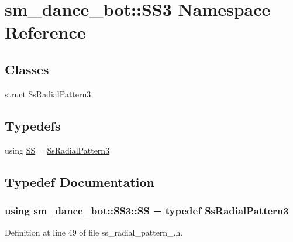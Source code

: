 \hypertarget{namespacesm__dance__bot_1_1SS3}{}\section{sm\+\_\+dance\+\_\+bot\+:\+:S\+S3 Namespace Reference}
\label{namespacesm__dance__bot_1_1SS3}
\subsection*{Classes}
\begin{DoxyCompactItemize}
\item 
struct \hyperlink{structsm__dance__bot_1_1SS3_1_1SsRadialPattern3}{Ss\+Radial\+Pattern3}
\end{DoxyCompactItemize}
\subsection*{Typedefs}
\begin{DoxyCompactItemize}
\item 
using \hyperlink{namespacesm__dance__bot_1_1SS3_aba7ea37bc21bc69fc2c374bd831c7ab1}{SS} = \hyperlink{structsm__dance__bot_1_1SS3_1_1SsRadialPattern3}{Ss\+Radial\+Pattern3}
\end{DoxyCompactItemize}


\subsection{Typedef Documentation}
\subsubsection[{\texorpdfstring{SS}{SS}}]{\setlength{\rightskip}{0pt plus 5cm}using {\bf sm\+\_\+dance\+\_\+bot\+::\+S\+S3\+::\+SS} = typedef {\bf Ss\+Radial\+Pattern3}}\hypertarget{namespacesm__dance__bot_1_1SS3_aba7ea37bc21bc69fc2c374bd831c7ab1}{}\label{namespacesm__dance__bot_1_1SS3_aba7ea37bc21bc69fc2c374bd831c7ab1}


Definition at line 49 of file ss\+\_\+radial\+\_\+pattern\+\_.\+h.

